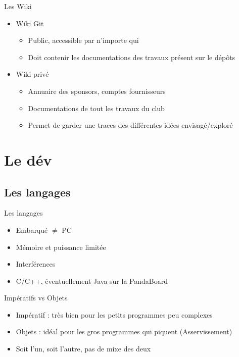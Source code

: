 \documentclass{beamer}
\begin{document}
\begin{frame}{Les Wiki}
	\begin{itemize}
		\item Wiki Git
			\begin{itemize}
				\item Public, accessible par n'importe qui
				\item Doit contenir les documentations des travaux présent sur le dépôts
			\end{itemize}
		\item Wiki privé
			\begin{itemize}
				\item Annuaire des sponsors, comptes fournisseurs
				\item Documentations de tout les travaux du club
				\item Permet de garder une traces des différentes idées envisagé/exploré
			\end{itemize}
	\end{itemize}
\end{frame}

\section{Le dév}
\subsection{Les langages}
\begin{frame}{Les langages}
	\begin{itemize}
		\item Embarqué $\neq$ PC
		\item Mémoire et puissance limitée
		\item Interférences
		\item C/C++, éventuellement Java sur la PandaBoard
	\end{itemize}
\end{frame}

\begin{frame}{Impératifs vs Objets}
	\begin{itemize}
		\item Impératif : très bien pour les petits programmes peu complexes
		\item Objets : idéal pour les gros programmes qui piquent (Asservissement)
		\item Soit l'un, soit l'autre, pas de mixe des deux
	\end{itemize}
\end{frame}
\end{document}
